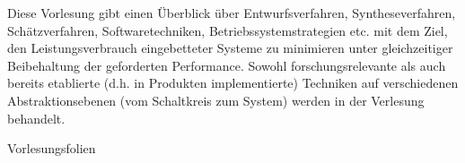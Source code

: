 \begin{course}
\begin{content}
Diese Vorlesung gibt einen Überblick über Entwurfsverfahren, Syntheseverfahren, Schätzverfahren, Softwaretechniken, Betriebssystemstrategien etc. mit dem Ziel, den Leistungsverbrauch eingebetteter Systeme zu minimieren unter gleichzeitiger Beibehaltung der geforderten Performance. Sowohl forschungsrelevante als auch bereits etablierte (d.h. in Produkten implementierte) Techniken auf verschiedenen Abstraktionsebenen (vom Schaltkreis zum System) werden in der Verlesung behandelt.


\end{content}

\begin{media}Vorlesungsfolien

\end{media}





\end{course}